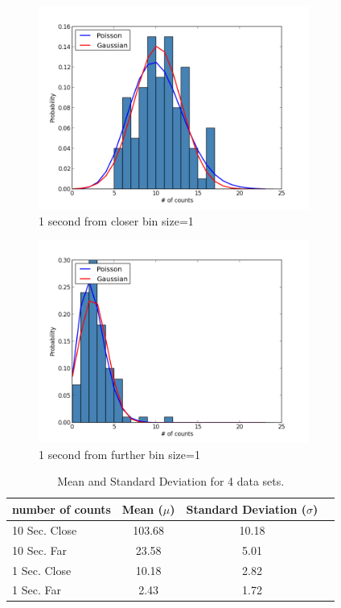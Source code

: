 \documentclass[aps,twocolumn,secnumarabic,nobalancelastpage,amsmath,amssymb,
nofootinbib]{revtex4}
\begin{document}
\begin{figure}[htbp]
\includegraphics[width=3.5in]{oc}
\caption{1 second from closer bin size=1}
\end{figure}

\begin{figure}[htbp]
\includegraphics[width=3.5in]{of}
\caption{1 second from further bin size=1}
\end{figure}



\begin{center}
\begin{table}[htbp]
\begin{tabular}{|l|c|c|r|}
\hline
{\small number of counts} & {\small Mean ($\mu$)} & {\small Standard Deviation ($\sigma$)}  \\
\hline
10 Sec. Close 	&  103.68  	& 10.18  \\
10 Sec. Far 	&  23.58   	& 5.01  \\
1  Sec. Close 	&  10.18  	& 2.82  \\
1  Sec. Far	 	&   2.43 	& 1.72  \\
\hline
\end{tabular}
\caption{\label{tab:linfitresults} Mean and Standard Deviation for 4 data sets.}
\end{table}
\end{center}
\end{document}
